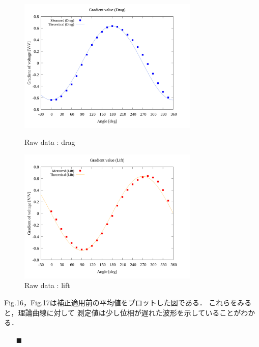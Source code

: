 \documentclass[twocolumn,a4j]{jsarticle}
\begin{document}
\begin{figure}[htbp]
    \footnotesize
    \begin{center}
        \includegraphics[width=86mm]{../graphes/1-ex/21/21-1_summary_drag.png}
        \caption{Raw data : drag}
        \includegraphics[width=86mm]{../graphes/1-ex/21/21-1_summary_lift.png}
        \caption{Raw data : lift}
    \end{center}
\end{figure}

Fig.16，Fig.17は補正適用前の平均値をプロットした図である．
これらをみると，理論曲線に対して
測定値は少し位相が遅れた波形を示していることがわかる．

\newpage

\begin{itemize}
    \item [$\blacksquare$] 
\end{itemize}
\end{document}
